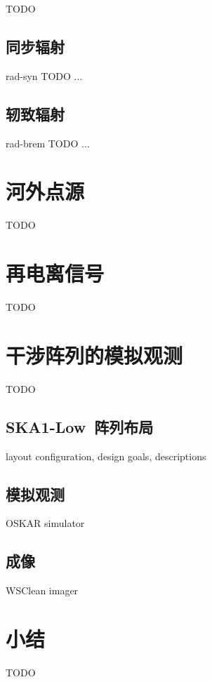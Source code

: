 TODO

\subsection{同步辐射}

\ac{rad-syn} TODO ...

\subsection{轫致辐射}

\ac{rad-brem} TODO ...


\section{河外点源}

TODO


\section{再电离信号}

TODO


\section{干涉阵列的模拟观测}

TODO

\subsection{SKA1-Low~阵列布局}

layout configuration, design goals, descriptions

\subsection{模拟观测}

OSKAR simulator

\subsection{成像}
\label{sec:imaging}

WSClean imager


\section{小结}

TODO


